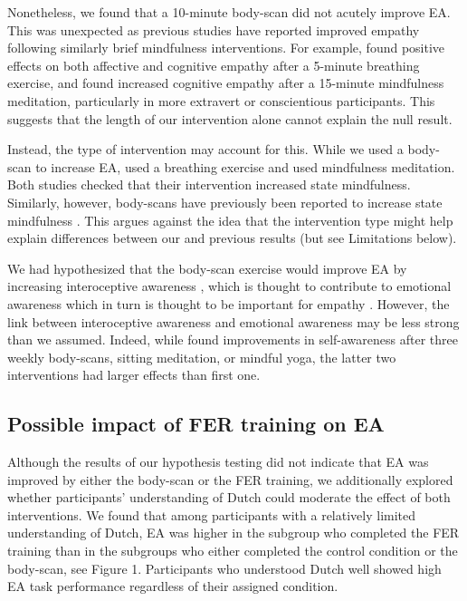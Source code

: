 \documentclass[authordate, empirical, issue]{jote-new-article}
\begin{document}
Nonetheless, we found that a 10-minute body-scan did not acutely improve EA. This was unexpected as previous studies have reported improved empathy following similarly brief mindfulness interventions. For example, \textcite{Tan2014} found positive effects on both affective and cognitive empathy after a 5-minute breathing exercise, and \textcite{Winning2015} found increased cognitive empathy after a 15-minute mindfulness meditation, particularly in more extravert or conscientious participants. This suggests that the length of our intervention alone cannot explain the null result.



Instead, the type of intervention may account for this. While we used a body-scan to increase EA, \textcite{Tan2014} used a breathing exercise and \textcite{Winning2015} used mindfulness meditation. Both studies checked that their intervention increased state mindfulness. Similarly, however, body-scans have previously been reported to increase state mindfulness \parencites{Upton2019}. This argues against the idea that the intervention type might help explain differences between our and previous results (but see Limitations below).



We had hypothesized that the body-scan exercise would improve EA by increasing interoceptive awareness \parencites{Fischer2017}, which is thought to contribute to emotional awareness which in turn is thought to be important for empathy \parencites{Cuff2016}{Gallup2002}. However, the link between interoceptive awareness and emotional awareness may be less strong than we assumed. Indeed, while \textcite{Sauer-Zavala2013} found improvements in self-awareness after three weekly body-scans, sitting meditation, or mindful yoga, the latter two interventions had larger effects than first one.



\subsection{Possible impact of FER training on EA}



Although the results of our hypothesis testing did not indicate that EA was improved by either the body-scan or the FER training, we additionally explored whether participants' understanding of Dutch could moderate the effect of both interventions. We found that among participants with a relatively limited understanding of Dutch, EA was higher in the subgroup who completed the FER training than in the subgroups who either completed the control condition or the body-scan, see Figure 1. Participants who understood Dutch well showed high EA task performance regardless of their assigned condition.
\end{document}
